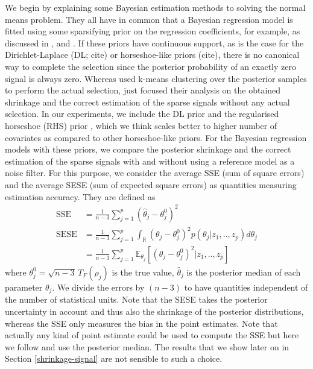 \documentclass[american,]{article}
\theoremstyle{definition}
\begin{document}
We begin by explaining some Bayesian estimation methods to solving the normal means problem. They all have in common that a Bayesian regression model is fitted using some sparsifying prior on the regression coefficients, for example, as discussed in \cite{paper:dirichlet_laplace}, \cite{bhadra2017horseshoe+} and \cite{johnstone2004needles}. If these priors have continuous support, as is the case for the Dirichlet-Laplace (DL; cite) or horseshoe-like priors (cite), there is no canonical way to complete the selection since the posterior probability of an exactly zero signal is always zero. Whereas \cite{paper:dirichlet_laplace} used k-means clustering over the posterior samples to perform the actual selection, \cite{bhadra2017horseshoe+} just focused their analysis on the obtained shrinkage and the correct estimation of the sparse signals without any actual selection. In our experiments, we include the DL prior and the regularised horseshoe (RHS) prior \citep{paper:rhs}, which we think scales better to higher number of covariates as compared to other horseshoe-like priors. For the Bayesian regression models with these priors, we compare the posterior shrinkage and the correct estimation of the sparse signals with and without using a reference model as a noise filter. For this purpose, we consider the   average SSE (sum of square errors) and the average SESE (sum of expected square errors) as quantities measuring estimation accuracy. They are defined as
\
\begin{align}
\text{SSE}&=\frac{1}{n-3}\sum_{j=1}^{p}(\hat{\theta}_{j} - \theta^{0}_{j})^{2} \label{eq:SSE} \\
\text{SESE}&=\frac{1}{n-3}\sum_{j=1}^{p}\int_{\mathbb{R}}(\theta_{j}-\theta^{0}_{j})^{2}p(\theta_{j}|z_{1},..,z_{p})d\theta_{j} \\
&=\frac{1}{n-3}\sum_{j=1}^{p}\mathbb{E}_{\theta_{j}}[(\theta_{j}-\theta^{0}_{j})^{2}|z_{1},..,z_{p}] \label{eq:SESE}
\end{align}
where $\theta_{j}^{0}=\sqrt{n-3}\,T_{F}(\rho_{j})$ is the true value, $\hat{\theta}_{j}$ is the posterior median of each parameter $\theta_{j}$. We divide the errors by $(n-3)$ to have quantities independent of the number of statistical units. Note that the SESE takes the posterior uncertainty in account and thus also the shrinkage of the posterior distributions, whereas the SSE only measures the bias in the point estimates. Note that actually any kind of point estimate could be used to compute the SSE but here we follow \cite{paper:dirichlet_laplace} and use the posterior median. The results that we show later on in Section \ref{shrinkage-signal} are not sensible to such a choice. 
\end{document}
